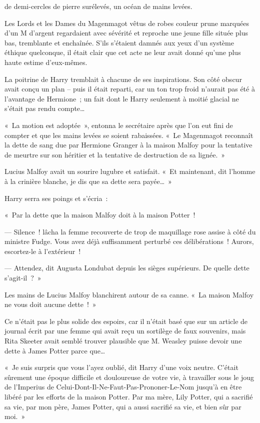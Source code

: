 
 de demi-cercles de pierre surélevés, un océan de mains levées.

\hplettrineextrapara
Les Lords et les Dames du Magenmagot vêtus de robes couleur prune marquées d'un M d'argent regardaient avec sévérité et reproche une jeune fille située plus bas, tremblante et enchaînée. S'ils s'étaient damnés aux yeux d'un système éthique quelconque, il était clair que cet acte ne leur avait donné qu'une plus haute estime d'eux-mêmes.

La poitrine de Harry tremblait à chacune de ses inspirations. Son côté obscur avait conçu un plan -- puis il était reparti, car un ton trop froid n'aurait pas été à l'avantage de Hermione~; un fait dont le Harry seulement à moitié glacial ne s'était pas rendu compte…

«~La motion est adoptée~», entonna le secrétaire après que l'on eut fini de compter et que les mains levées se soient rabaissées. «~Le Magenmagot reconnaît la dette de sang due par Hermione Granger à la maison Malfoy pour la tentative de meurtre sur son héritier et la tentative de destruction de sa lignée.~»

Lucius Malfoy avait un sourire lugubre et satisfait. «~Et maintenant, dit l'homme à la crinière blanche, je dis que sa dette sera payée…~»

Harry serra ses poings et s'écria~:

«~Par la dette que la maison Malfoy doit à la maison Potter~!

--- Silence~! lâcha la femme recouverte de trop de maquillage rose assise à côté du ministre Fudge. Vous avez déjà suffisamment perturbé ces délibérations~! Aurors, escortez-le à l'extérieur~!

--- Attendez, dit Augusta Londubat depuis les sièges supérieurs. De quelle dette s'agit-il~?~»

Les mains de Lucius Malfoy blanchirent autour de sa canne. «~La maison Malfoy ne vous doit aucune dette~!~»

Ce n'était pas le plus solide des espoirs, car il n'était basé que sur un article de journal écrit par une femme qui avait reçu un sortilège de faux souvenirs, mais Rita Skeeter avait semblé trouver plausible que M. Weasley puisse devoir une dette à James Potter parce que…

«~Je suis surpris que vous l'ayez oublié, dit Harry d'une voix neutre. C'était sûrement une époque difficile et douloureuse de votre vie, à travailler sous le joug de l'Imperius de Celui-Dont-Il-Ne-Faut-Pas-Prononer-Le-Nom jusqu'à en être libéré par les efforts de la maison Potter. Par ma mère, Lily Potter, qui a sacrifié sa vie, par mon père, James Potter, qui a aussi sacrifié sa vie, et bien sûr par moi.~»

